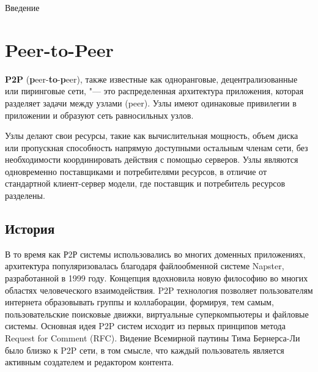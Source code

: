 \documentclass[bachelor, och, coursework]{SCWorks}
\begin{document}




\tableofcontents

\intro
Введение

\section{Peer-to-Peer} %
\textbf{P2P} (\textbf{p}eer-\textbf{to}-\textbf{p}eer), также известные как одноранговые, децентрализованные или пиринговые сети, 
"--- это распределенная архитектура приложения, которая разделяет задачи между узлами (peer). 
Узлы имеют одинаковые привилегии в приложении и образуют сеть равносильных узлов.

Узлы делают свои ресурсы, такие как вычислительная мощность, объем диска или пропускная способность напрямую доступными остальным членам сети, 
без необходимости координировать действия с помощью серверов. Узлы являются одновременно поставщиками и потребителями ресурсов, 
в отличие от стандартной клиент-сервер модели, где поставщик и потребитель ресурсов разделены. \cite{P2P_1}

\subsection{История}
В то время как Р2Р системы использовались во многих доменных приложениях, архитектура популяризовалась благодаря файлообменной системе Napster, 
разработанной в 1999 году. Концепция вдохновила новую философию во многих областях человеческого взаимодействия. 
P2P технология позволяет пользователям интернета образовывать группы и коллаборации, формируя, тем самым, пользовательские поисковые движки, 
виртуальные суперкомпьютеры и файловые системы. Основная идея P2P систем исходит из первых принципов метода Request for Comment (RFC). 
Видение Всемирной паутины Тима Бернерса-Ли было близко к P2P сети, в том смысле, 
что каждый пользователь является активным создателем и редактором контента.
\end{document}
